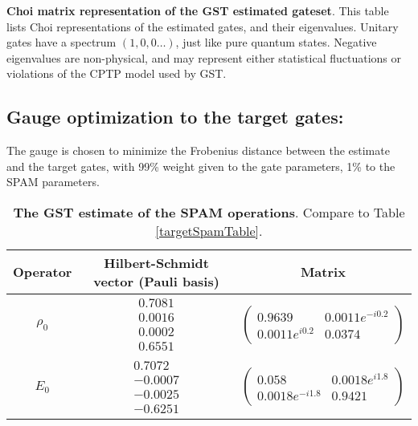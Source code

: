 {\begin{table}[h]
\begin{center}
\caption{\textbf{Choi matrix representation of the GST estimated gateset}.  This table lists Choi representations of the estimated gates, and their eigenvalues.  Unitary gates have a spectrum $(1,0,0\ldots)$, just like pure quantum states.  Negative eigenvalues are non-physical, and may represent either statistical fluctuations or violations of the CPTP model used by GST.\label{bestTargetSpamGatesetChoiTable}}
\end{center}
\end{table}

\clearpage

\subsection{Gauge optimization to the target gates:}
The gauge is chosen to minimize the Frobenius distance between the estimate and the target gates, with 99\% weight given to the gate parameters, 1\% to the SPAM parameters.


\begin{table}[h]
\begin{center}
\begin{tabular}[l]{|c|c|c|}
\hline
Operator & Hilbert-Schmidt vector (Pauli basis) & Matrix \\ \hline
$\rho_{0}$ & $ \begin{array}{c}
0.7081 \\ 
0.0016 \\ 
0.0002 \\ 
0.6551
 \end{array} $
 & $ \left(\!\!\begin{array}{cc}
0.9639 & 0.0011e^{-i0.2} \\ 
0.0011e^{i0.2} & 0.0374
 \end{array}\!\!\right) $
 \\ \hline
$E_{0}$ & $ \begin{array}{c}
0.7072 \\ 
-0.0007 \\ 
-0.0025 \\ 
-0.6251
 \end{array} $
 & $ \left(\!\!\begin{array}{cc}
0.058 & 0.0018e^{i1.8} \\ 
0.0018e^{-i1.8} & 0.9421
 \end{array}\!\!\right) $
 \\ \hline
\end{tabular}

\caption{\textbf{The GST estimate of the SPAM operations}.  Compare to Table \ref{targetSpamTable}.\label{bestTargetGatesGatesetSpamTable}}
\end{center}
\end{table}

}
